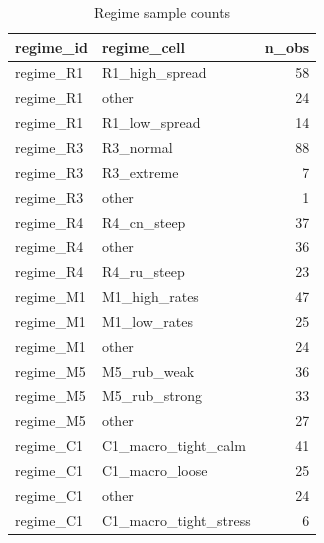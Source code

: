 \begin{table}
\caption{Regime sample counts}
\label{tab:7_4}
\begin{tabular}{llr}
\toprule
regime_id & regime_cell & n_obs \\
\midrule
regime_R1 & R1_high_spread & 58 \\
regime_R1 & other & 24 \\
regime_R1 & R1_low_spread & 14 \\
regime_R3 & R3_normal & 88 \\
regime_R3 & R3_extreme & 7 \\
regime_R3 & other & 1 \\
regime_R4 & R4_cn_steep & 37 \\
regime_R4 & other & 36 \\
regime_R4 & R4_ru_steep & 23 \\
regime_M1 & M1_high_rates & 47 \\
regime_M1 & M1_low_rates & 25 \\
regime_M1 & other & 24 \\
regime_M5 & M5_rub_weak & 36 \\
regime_M5 & M5_rub_strong & 33 \\
regime_M5 & other & 27 \\
regime_C1 & C1_macro_tight_calm & 41 \\
regime_C1 & C1_macro_loose & 25 \\
regime_C1 & other & 24 \\
regime_C1 & C1_macro_tight_stress & 6 \\
\bottomrule
\end{tabular}
\end{table}
